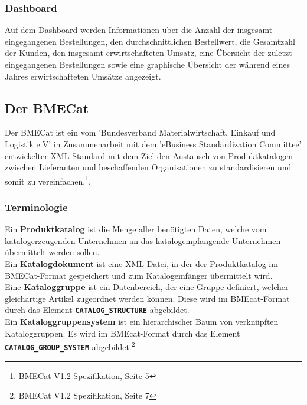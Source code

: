 	\subsubsection{Dashboard}
	
	Auf dem Dashboard werden Informationen über die Anzahl der insgesamt eingegangenen Bestellungen, den durchschnittlichen Bestellwert, die Gesamtzahl der Kunden, den insgesamt erwirtschafteten Umsatz, eine Übersicht der zuletzt eingegangenen Bestellungen sowie eine graphische Übersicht der während eines Jahres erwirtschafteten Umsätze angezeigt. 
	
	\subsection{Der BMECat}
	
	Der BMECat ist ein vom 'Bundesverband Materialwirtschaft, Einkauf und Logistik e.V' in Zusammenarbeit mit dem 'eBusiness Standardization Committee' entwickelter XML
	Standard mit dem Ziel den Austausch von Produktkatalogen zwischen Lieferanten und beschaffenden Organisationen zu standardisieren und somit zu vereinfachen.\footnote{BMECat V1.2 Spezifikation, Seite 5}. 
	
	\subsubsection{Terminologie}
	Ein \textbf{Produktkatalog} ist die Menge aller benötigten Daten, welche vom katalogerzeugenden Unternehmen an das katalogempfangende Unternehmen übermittelt werden sollen.\\
	Ein \textbf{Katalogdokument} ist eine XML-Datei, in der der Produktkatalog im BMECat-Format gespeichert und zum Katalogemfänger übermittelt wird.\\
	Eine \textbf{Kataloggruppe} ist ein Datenbereich, der eine Gruppe definiert, welcher gleichartige Artikel zugeordnet werden können. Diese wird im BMEcat-Format durch das Element \texttt{\textbf{CATALOG\_STRUCTURE}} abgebildet.\\
	Ein \textbf{Kataloggruppensystem} ist ein hierarchischer Baum von verknüpften Kataloggruppen. Es wird
	im BMEcat-Format durch das Element \texttt{\textbf{CATALOG\_GROUP\_SYSTEM}} abgebildet.\footnote{BMECat V1.2 Spezifikation, Seite 7}
	
